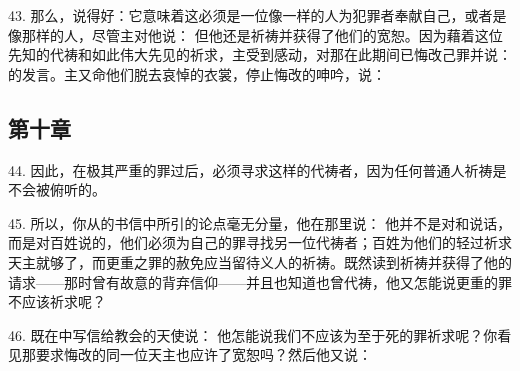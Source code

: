 43. 那么，说得好：它意味着这必须是一位像一样的人为犯罪者奉献自己，或者是像那样的人，尽管主对他说： 但他还是祈祷并获得了他们的宽恕。因为藉着这位先知的代祷和如此伟大先见的祈求，主受到感动，对那在此期间已悔改己罪并说：的发言。主又命他们脱去哀悼的衣裳，停止悔改的呻吟，说：\par


\subsection{第十章}

\par

44. 因此，在极其严重的罪过后，必须寻求这样的代祷者，因为任何普通人祈祷是不会被俯听的。\par

45. 所以，你从的书信中所引的论点毫无分量，他在那里说： 他并不是对和说话，而是对百姓说的，他们必须为自己的罪寻找另一位代祷者；百姓为他们的轻过祈求天主就够了，而更重之罪的赦免应当留待义人的祈祷。既然读到祈祷并获得了他的请求——那时曾有故意的背弃信仰——并且也知道也曾代祷，他又怎能说更重的罪不应该祈求呢？\par

46. 既在中写信给教会的天使说： 他怎能说我们不应该为至于死的罪祈求呢？你看见那要求悔改的同一位天主也应许了宽恕吗？然后他又说：\par

